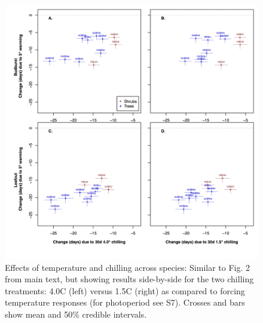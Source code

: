\documentclass{article}
\begin{document}
\begin{figure}
\label{figS6}
\includegraphics[width=1\textwidth]{FigChill2_4panel.png}
\caption{Effects of temperature and chilling across species: Similar to Fig. 2 from main text, but showing results side-by-side for the two chilling treatments: 4.0\degree C (left) versus 1.5\degree C (right) as compared to forcing temperature responses (for photoperiod see S7). Crosses and bars show mean and 50\% credible intervals.}
\end{figure}
\end{document}
